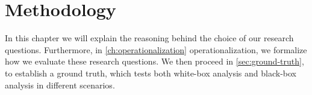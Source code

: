\chapter{Methodology}\label{ch:methodology}

In this chapter we will explain the reasoning behind the choice of our research questions. 
Furthermore, in \autoref{ch:operationalization} operationalization, we formalize how we evaluate these research questions. 
We then proceed in \autoref{sec:ground-truth}, to establish a ground truth, which tests both white-box analysis and black-box analysis in 
different scenarios.


